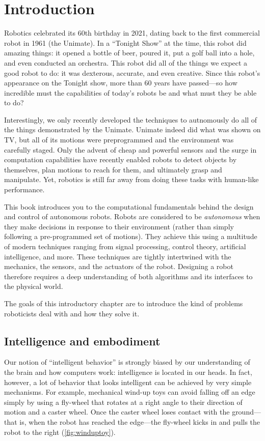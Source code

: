 \chapter{Introduction}\label{chap:introduction}

Robotics celebrated its 60th birthday in 2021, dating back to the first commercial robot in 1961 (the Unimate). In a ``Tonight Show'' at the time, this robot did amazing things: it opened a bottle of beer, poured it, put a golf ball into a hole, and even conducted an orchestra. This robot did all of the things we expect a good robot to do: it was dexterous, accurate, and even creative. Since this robot's appearance on the Tonight show, more than 60 years have passed---so how incredible must the capabilities of today's robots be and what must they be able to do?

Interestingly, we only recently developed the techniques to autnomously do all of the things demonstrated by the Unimate. Unimate indeed did what was shown on TV, but all of its motions were preprogrammed and the environment was carefully staged. Only the advent of cheap and powerful sensors and the surge in computation capabilities have recently enabled robots to detect objects by themselves, plan motions to reach for them, and ultimately grasp and manipulate. Yet, robotics is still far away from doing these tasks with human-like performance.

This book introduces you to the computational fundamentals behind the design and control of autonomous robots. Robots are considered to be \textsl{autonomous} when they make decisions in response to their environment (rather than simply following a pre-programmed set of motions). They achieve this using a multitude of modern techniques ranging from signal processing, control theory, artificial intelligence, and more. These techniques are tightly intertwined  with the mechanics, the sensors, and the actuators of the robot. Designing a robot therefore requires a deep understanding of both algorithms and its interfaces to the physical world.

The goals of this introductory chapter are to introduce the kind of problems roboticists deal with and how they solve it.

\section{Intelligence and embodiment}

Our notion of ``intelligent behavior'' is strongly biased by our understanding of the brain and how computers work: intelligence is located in our heads. In fact, however, a lot of behavior that looks intelligent can be achieved by very simple mechanisms. For example, mechanical wind-up toys can avoid falling off an edge simply by using a fly-wheel that rotates at a right angle to their direction of motion and a caster wheel. Once the caster wheel loses contact with the ground---that is, when the robot has reached the edge---the fly-wheel kicks in and pulls the robot to the right (\cref{fig:winduptoy}).

